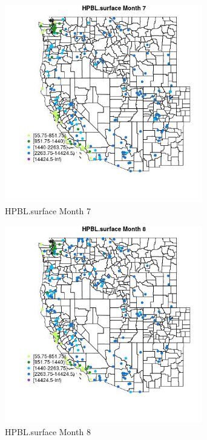 \begin{figure} 
\centering  
\includegraphics[width=0.77\textwidth]{Code_Outputs/Report_ML_input_PM25_Step4_part_e_de_duplicated_aveswNAs_MapObsMo7HPBLsurface.jpg} 
\caption{\label{fig:Report_ML_input_PM25_Step4_part_e_de_duplicated_aveswNAsMapObsMo7HPBLsurface}HPBL.surface Month 7} 
\end{figure} 
 

\begin{figure} 
\centering  
\includegraphics[width=0.77\textwidth]{Code_Outputs/Report_ML_input_PM25_Step4_part_e_de_duplicated_aveswNAs_MapObsMo8HPBLsurface.jpg} 
\caption{\label{fig:Report_ML_input_PM25_Step4_part_e_de_duplicated_aveswNAsMapObsMo8HPBLsurface}HPBL.surface Month 8} 
\end{figure} 
 

